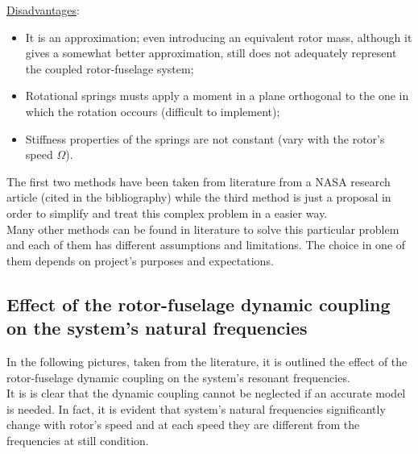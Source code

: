 \medskip
\underline{Disadvantages}: 
\begin{itemize}
	\item It is an approximation; even introducing an equivalent rotor mass, although it gives a somewhat
	better approximation, still does not adequately represent the coupled rotor-fuselage system;
	\item Rotational springs musts apply a moment in a plane orthogonal to the one in which the rotation occours (difficult to implement);
	\item Stiffness properties of the springs are not constant  (vary with the rotor's speed $\Omega$).
\end{itemize}


\bigskip
\noindent
The first two methods have been taken from literature from a NASA research article (cited in the bibliography) while the third method is just a proposal in order to simplify and treat this complex problem in a easier way. \\
Many other methods can be found in literature to solve this particular problem and each of them has different assumptions and limitations. The choice in one of them depends on project's purposes and expectations.


\clearpage
\subsection*{Effect of the rotor-fuselage dynamic coupling on the system's natural frequencies}
\noindent
In the following pictures, taken from the literature, it is outlined the effect of the rotor-fuselage dynamic coupling on the system's resonant frequencies. \\
It is is clear that the dynamic coupling cannot be neglected if an accurate model is needed. In fact, it is evident that system's natural frequencies significantly change with rotor's speed and at each speed they are different from the frequencies at still condition. \\

